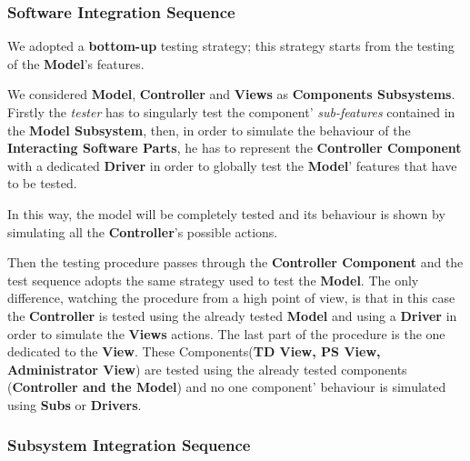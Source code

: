 \subsubsection{Software Integration Sequence}
We adopted a \textbf{bottom-up} testing strategy; this strategy starts from the testing of the \textbf{Model}'s features.\par
We considered \textbf{Model}, \textbf{Controller} and \textbf{Views} as \textbf{Components Subsystems}.
Firstly the \textit{tester} has to singularly test the component' \textit{sub-features} contained in the \textbf{Model Subsystem}, then, in order to simulate the behaviour of the \textbf{Interacting Software Parts}, he has to represent the \textbf{Controller Component} with a dedicated \textbf{Driver} in order to globally test the \textbf{Model}' features that have to be tested.\par In this way, the model will be completely tested and its behaviour is shown by simulating all the \textbf{Controller}'s possible actions.\par
Then the testing procedure passes through the \textbf{Controller Component} and the test sequence adopts the same strategy used to test the \textbf{Model}. The only difference, watching the procedure from a high point of view, is that in this case the \textbf{Controller} is tested using the already tested \textbf{Model} and using a \textbf{Driver} in order to simulate the \textbf{Views} actions.
The last part of the procedure is the one dedicated to the \textbf{View}. These Components(\textbf{TD View, PS View, Administrator View}) are tested using the already tested components (\textbf{Controller and the Model}) and no one component' behaviour is simulated using \textbf{Subs} or \textbf{Drivers}.
\subsubsection{Subsystem Integration Sequence}
